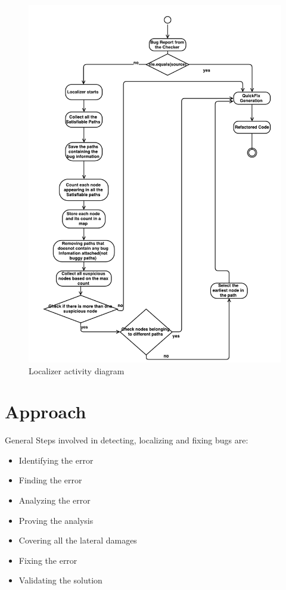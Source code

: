 \begin{figure}[!htb]
\centering
\includegraphics[trim=0.0cm 0.0cm 0.0cm 0.0cm, scale=0.75]{pdf/Localizer.pdf}
\vspace{-0.5cm}
\caption{Localizer activity diagram}
\label{fig:localizer}
\end{figure}

\chapter{Approach}
\label{chapter:Approach}

General Steps involved in detecting, localizing and fixing bugs are:
\begin{itemize}
 \item Identifying the error
 \item Finding the error
 \item Analyzing the error
 \item Proving the analysis
 \item Covering all the lateral damages
 \item Fixing the error
 \item Validating the solution
\end{itemize}

